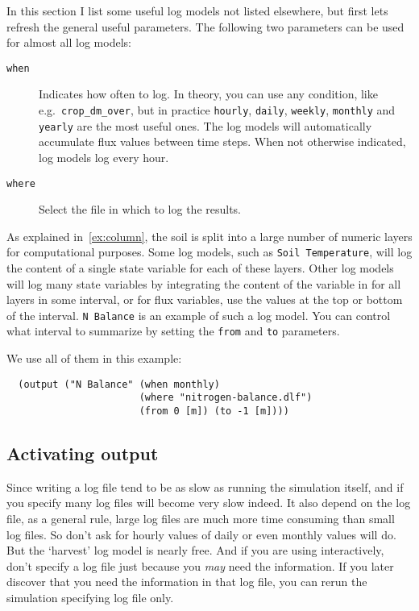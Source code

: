 \documentclass[a4paper,11pt]{article}
\begin{document}
In this section I list some useful log models not listed elsewhere,
but first lets refresh the general useful parameters.  The following
two parameters can be used for almost all log models:
\begin{description}
\item[\texttt{when}] Indicates how often to log.  In theory, you can
  use any condition, like e.g.\ \texttt{crop\_dm\_over}, but in
  practice \texttt{hourly}, \texttt{daily}, \texttt{weekly},
  \texttt{monthly} and \texttt{yearly} are the most useful ones.  The
  log models will automatically accumulate flux values between time
  steps.  When not otherwise indicated, log models log every hour.
\item[\texttt{where}] Select the file in which to log the results.
\end{description}

As explained in~\ref{ex:column}, the soil is split into a large number
of numeric layers for computational purposes.  Some log models, such
as \texttt{Soil Temperature}, will log the content of a single state
variable for each of these layers.  Other log models will log many
state variables by integrating the content of the variable in for all
layers in some interval, or for flux variables, use the values at the
top or bottom of the interval.  \texttt{N Balance} is an example of
such a log model.  You can control what interval to summarize by
setting the \texttt{from} and \texttt{to} parameters.

We use all of them in this example:
\begin{verbatim}
  (output ("N Balance" (when monthly)
                       (where "nitrogen-balance.dlf")
                       (from 0 [m]) (to -1 [m])))
\end{verbatim}

\subsection{Activating output}
\label{sec:actout}

Since writing a log file tend to be as slow as running the
simulation itself, and if you specify many log files \daisy{} will
become very slow indeed.  It also depend on the log file, as a general
rule, large log files are much more time consuming than small log
files.  So don't ask for hourly values of daily or even monthly values
will do.  But the `harvest' log model is nearly free.  And if you are
using \daisy{} interactively, don't specify a log file just because
you \emph{may} need the information.  If you later discover that you
need the information in that log file, you can rerun the simulation
specifying log file only.
\end{document}
